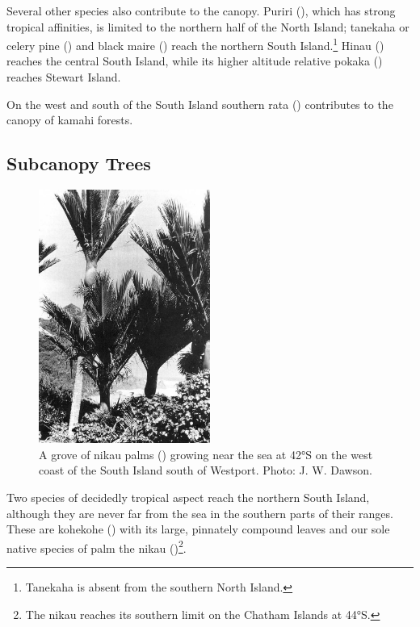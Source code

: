 Several other species also contribute to the canopy.
Puriri (), which has strong tropical affinities, is limited to the northern half of the North Island; tanekaha or celery pine () and black maire () reach the northern South Island.\footnote{Tanekaha is absent from the southern North Island.}
Hinau () reaches the central South Island, while its higher altitude relative pokaka () reaches Stewart Island.

On the west and south of the South Island southern rata () contributes to the canopy of kamahi forests.

\subsection{Subcanopy Trees}

\begin{figure}
	\includegraphics[width=0.5\textwidth]{graphics/figure60nikau.jpg}
	\centering
	\caption[A grove of nikau palms]{A grove of nikau palms () growing near the sea at 42°S on the west coast of the South Island south of Westport. Photo:  J. W. Dawson.}%
	\label{fig:60nikau}
\end{figure}

Two species of decidedly tropical aspect reach the northern South Island, although they are never far from the sea in the southern parts of their ranges.
These are kohekohe () with its large, pinnately compound leaves and our sole native species of palm the nikau ()\footnote{The nikau reaches its southern limit on the Chatham Islands at 44°S.}.


